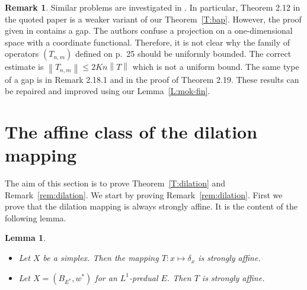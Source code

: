 \documentclass{amsart}
\numberwithin{equation}{section}
\newtheorem{lemma}[thm]{Lemma}
\theoremstyle{definition}
\newtheorem{remark}[thm]{Remark}
\newcommand{\norm}[1]{\left\|#1\right\|}
\begin{document}
\begin{remark} Similar problems are investigated in \cite{MeSta}. In particular, Theorem 2.12 in the quoted paper is a weaker variant of our Theorem~\ref{T:bap}. However, the proof given in \cite{MeSta} contains a gap. The authors confuse a projection on a one-dimensional space with a coordinate functional. Therefore, it is not clear why the family of operators $(T_{n,m})$ defined on p.\ 25 should be uniformly bounded. The correct estimate is $\norm{T_{n,m}}\le 2Kn\norm{T}$ which is not a uniform bound. The same type of a gap is in Remark 2.18.1 and in the proof of Theorem 2.19. These results can be repaired and improved using our Lemma~\ref{L:mok-fin}.
\end{remark}

\section{The affine class of the dilation mapping}\label{Sec:dilation}

The aim of this section is to prove Theorem~\ref{T:dilation} and Remark~\ref{rem:dilation}.
We start by proving Remark~\ref{rem:dilation}. First we prove that the dilation mapping is always strongly affine.
It is the content of the following lemma.

\begin{lemma}\label{l:te-sa} \
\begin{itemize}
	\item[(S)] Let $X$ be a simplex. Then the mapping $T:x\mapsto\delta_x$ is strongly affine.
	\item[(R,C)] Let $X=(B_{E^*},w^*)$ for an $L^1$-predual $E$. Then $T$ is strongly affine.
\end{itemize}
\end{lemma}
\end{document}
